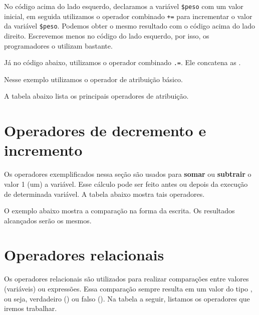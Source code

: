 No código acima do lado esquerdo, declaramos a variável \texttt{\$peso} com um valor inicial,
em seguida utilizamos o operador combinado \texttt{+=} para incrementar o valor da
variável \texttt{\$peso}. Podemos obter o mesmo resultado com o código acima do lado direito.
Escrevemos menos no código do lado esquerdo, por isso, os programadores o utilizam bastante.

Já no código abaixo, utilizamos o operador combinado \texttt{.=}. Ele concatena as \tipostrings.



Nesse exemplo utilizamos o operador de atribuição básico.



A tabela abaixo lista os principais operadores de atribuição. 



\section{Operadores de decremento e incremento}
\label{operadores-de-decremento-e-incremento}

Os operadores exemplificados nessa seção são usados para \textbf{somar} ou \textbf{subtrair}
o valor 1 (um) a variável. Esse cálculo pode ser feito antes ou depois da execução de 
determinada variável. A tabela abaixo mostra tais operadores.



O exemplo abaixo mostra a comparação na forma da escrita. Os resultados alcançados serão
os mesmos.



\section{Operadores relacionais}
\label{operadores-relacionais}

Os operadores relacionais são utilizados para realizar comparações entre valores (variáveis)
ou expressões. Essa comparação sempre resulta em um valor do tipo \booleano, ou seja,
verdadeiro (\true) ou falso (\false). Na tabela a seguir, listamos os operadores
que iremos trabalhar.

